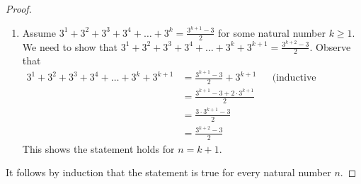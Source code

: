 \documentclass[DIN, pagenumber=false, fontsize=11pt, parskip=half]{scrartcl}
\begin{document}
\begin{problems}
\begin{proof}
\begin{enumerate}
            \item Assume $3^1+3^2+3^3+3^4+\dots +3^k = \frac{3^{k+1}-3}{2}$ for some natural number $k \geq 1$.
                We need to show that $3^1+3^2+3^3+3^4+\dots +3^k + 3^{k+1} = \frac{3^{k+2}-3}{2}$.
                Observe that 
                \begin{align*}
                    3^1+3^2+3^3+3^4+\dots +3^k + 3^{k+1} &= \frac{3^{k+1}-3}{2} + 3^{k+1} && \text{(inductive hypothesis)}\\ 
                                                         &= \frac{3^{k+1}-3+2\cdot3^{k+1}}{2}\\ 
                                                         &= \frac{3\cdot3^{k+1}-3}{2}\\ 
                                                         &= \frac{3^{k+2}-3}{2}
                \end{align*}
                This shows the statement holds for $n = k+1$.
        \end{enumerate}
        It follows by induction that the statement is true for every natural number $n$.
    \end{proof}
\end{problems}
\end{document}

